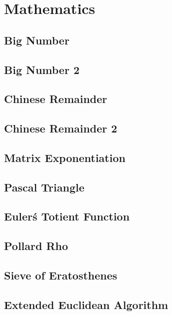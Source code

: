 \section{Mathematics}
\subsection{Big Number}
\raggedbottom
\hrulefill
\subsection{Big Number 2}
\raggedbottom
\hrulefill
\subsection{Chinese Remainder}
\raggedbottom
\hrulefill
\subsection{Chinese Remainder 2}
\raggedbottom
\hrulefill
\subsection{Matrix Exponentiation}
\raggedbottom
\hrulefill
\subsection{Pascal Triangle}
\raggedbottom
\hrulefill
\subsection{Euler\'s Totient Function}
\raggedbottom
\hrulefill
\subsection{Pollard Rho}
\raggedbottom
\hrulefill
\subsection{Sieve of Eratosthenes}
\raggedbottom
\hrulefill
\subsection{Extended Euclidean Algorithm}
\raggedbottom
\hrulefill
